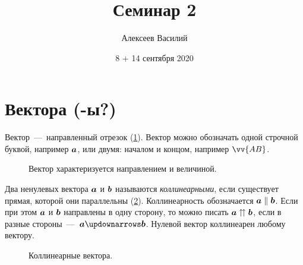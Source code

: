 \documentclass[a4paper,12pt]{article}
\author{Алексеев Василий}
\title{Семинар 2}
\date{8 + 14 сентября 2020}
\begin{document}
  \maketitle
  
  \tableofcontents

  \thispagestyle{empty}
  
  \newpage
  


  \section{Вектора (-ы?)}
  
  Вектор~---~направленный отрезок (\ref{fig:vector}).
  Вектор можно обозначать одной строчной буквой, например $\boldsymbol a$, или двумя: началом и концом, например $\vv{AB}$.
  
  \begin{figure}[h]
    \centering
    
    
    \caption{Вектор характеризуется направлением и величиной.}
    \label{fig:vector}
  \end{figure}
  
  \begin{definition}[Коллинеарность]
    Два ненулевых вектора $\boldsymbol a$ и $\boldsymbol b$ называются \emph{коллинеарными}, если существует прямая, которой они параллельны (\ref{fig:collinearity}).
    Коллинеарность обозначается $\bds a \hm\parallel \bds b$.
    Если при этом $\boldsymbol a$ и $\boldsymbol b$ направлены в одну сторону, то можно писать $\bds a \hm\upuparrows \bds b$,
    если в разные стороны~---~$\bds a \hm\updownarrows \bds b$.
    Нулевой вектор коллинеарен любому вектору.
  \end{definition}
  
  \begin{figure}[h]
    \centering
    
    
    \caption{Коллинеарные вектора.}
    \label{fig:collinearity}
  \end{figure}
  
\end{document}
